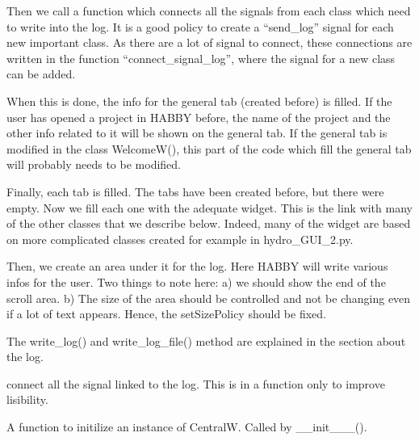 \documentclass[letterpaper,10pt,english]{sphinxmanual}
\begin{document}
\begin{fulllineitems}
Then we call a function which connects all the signals from each class which need to write into the log. It is a good
policy to create a “send\_log” signal for each new important class. As there are a lot of signal to connect, these
connections are written in the function “connect\_signal\_log”, where the signal for a new class can be added.

When this is done, the info for the general tab (created before) is filled. If the user has opened a project in HABBY
before, the name of the project and the other info related to it will be shown on the general tab. If the general
tab is modified in the class WelcomeW(), this part of the code which fill the general tab will probably needs to
be modified.

Finally, each tab is filled. The tabs have been created before, but there were empty. Now we fill each one with the
adequate widget. This is the link with many of the other classes that we describe below. Indeed, many of the widget
are based on more complicated classes created for example in hydro\_GUI\_2.py.

Then, we create an area under it for the log. Here HABBY will write various infos for the user. Two things to note
here: a) we should show the end of the scroll area. b) The size of the area should be controlled and not be
changing even if a lot of text appears. Hence, the setSizePolicy should be fixed.

The write\_log() and write\_log\_file() method are explained in the section about the log.

\begin{fulllineitems}
\label{\detokenize{index:src_GUI.Main_windows_1.CentralW.connect_signal_log}}
connect all the signal linked to the log. This is in a function only to improve lisibility.

\end{fulllineitems}


\begin{fulllineitems}
\label{\detokenize{index:src_GUI.Main_windows_1.CentralW.init_iu}}
A function to initilize an instance of CentralW. Called by \_\_init\_\_\_().

\end{fulllineitems}


\end{fulllineitems}
\end{document}
